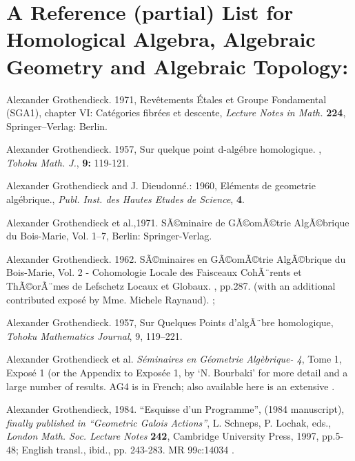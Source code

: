 \documentclass[12pt]{article}
\theoremstyle{plain}
\theoremstyle{definition}
\numberwithin{equation}{section}
\begin{document}
\section{A Reference (partial) List for Homological Algebra, Algebraic Geometry and Algebraic Topology:}

\begin{thebibliography}{99}

Alexander Grothendieck. 1971, Rev\^{e}tements \'Etales et Groupe Fondamental (SGA1),
chapter VI: Cat\'egories fibr\'ees et descente, \emph{Lecture Notes in Math.}
\textbf{224}, Springer--Verlag: Berlin.

Alexander Grothendieck. 1957, Sur quelque point d-alg\'{e}bre homologique. , \emph{Tohoku Math. J.}, \textbf{9:} 119-121.

Alexander Grothendieck and J. Dieudonn\'{e}.: 1960, El\'{e}ments de geometrie alg\'{e}brique., \emph{Publ. Inst. des Hautes Etudes de Science}, \textbf{4}.

Alexander Grothendieck et al.,1971. SÃ©minaire de GÃ©omÃ©trie AlgÃ©brique du Bois-Marie, Vol. 1--7, Berlin: Springer-Verlag.

Alexander Grothendieck. 1962. SÃ©minaires en GÃ©omÃ©trie AlgÃ©brique du Bois-Marie, Vol. 2 - Cohomologie Locale des Faisceaux CohÃ¨rents et ThÃ©orÃ¨mes de Lefschetz Locaux et Globaux. , pp.287. (with an additional contributed expos\'e by Mme. Michele Raynaud). 
;

Alexander Grothendieck. 1957, Sur Quelques Points d'algÃ¨bre homologique, {\em Tohoku Mathematics Journal}, 9, 119--221.
 
Alexander Grothendieck et al. \emph{S\'eminaires en G\'eometrie Alg\`ebrique- 4}, Tome 1, Expos\'e 1 
(or the Appendix to Expos\'ee 1, by `N. Bourbaki' for more detail and a large number of results.
AG4 is  in French;
also available here is an extensive 
.

Alexander Grothendieck, 1984. ``Esquisse d'un Programme'', (1984 manuscript), 
{\em finally published in ``Geometric Galois Actions''}, L. Schneps, P. Lochak, eds., 
{\em London Math. Soc. Lecture Notes} {\bf 242}, Cambridge University Press, 1997, pp.5-48;
English transl., ibid., pp. 243-283. MR 99c:14034 .


\end{thebibliography}
\end{document}

